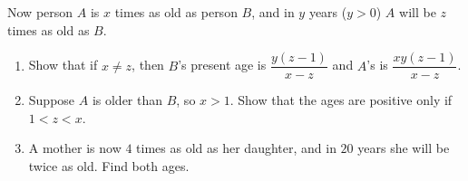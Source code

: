 Now person $A$ is $x$ times as old as person $B$, and in $y$ years ($y>0$) $A$ will be $z$ times as old as $B$.
\begin{enumerate}
\item[(a)] Show that if $x\ne z$, then $B$'s present age is $\dfrac{y(z-1)}{x-z}$ and $A$'s is $\dfrac{xy(z-1)}{x-z}$.
\item[(b)] Suppose $A$ is older than $B$, so $x>1$. Show that the ages are positive only if $1<z<x$.
\item[(c)] A mother is now $4$ times as old as her daughter, and in $20$ years she will be twice as old. Find both ages.
\end{enumerate}
